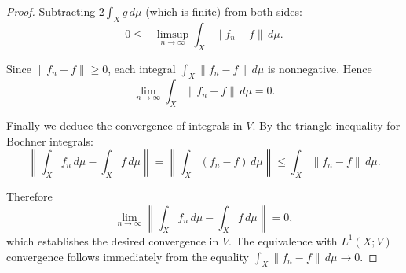 \begin{proof}
Subtracting $2\int_X g\,d\mu$ (which is finite) from both sides:
$$0 \leq -\limsup_{n \to \infty} \int_X \|f_n - f\|\,d\mu.$$

Since $\|f_n - f\| \geq 0$, each integral $\int_X \|f_n - f\|\,d\mu$ is nonnegative. Hence
$$\lim_{n \to \infty} \int_X \|f_n - f\|\,d\mu = 0.$$

Finally we deduce the convergence of integrals in $V$. By the triangle inequality for Bochner integrals:
$$\left\| \int_X f_n\,d\mu - \int_X f\,d\mu \right\| = \left\| \int_X (f_n - f)\,d\mu \right\| \leq \int_X \|f_n - f\|\,d\mu.$$

Therefore
$$\lim_{n \to \infty} \left\| \int_X f_n\,d\mu - \int_X f\,d\mu \right\| = 0,$$
which establishes the desired convergence in $V$. The equivalence with $L^1(X; V)$ convergence follows immediately from the equality $\int_X \|f_n - f\|\,d\mu \to 0$.
\end{proof}